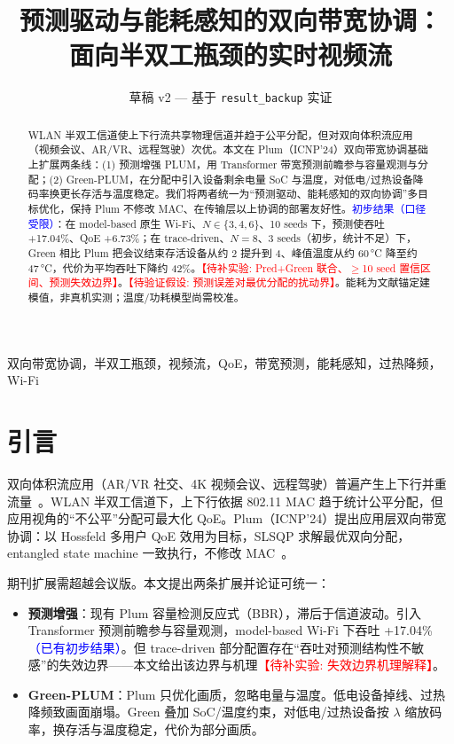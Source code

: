 \documentclass[journal,10pt]{IEEEtran}
\title{预测驱动与能耗感知的双向带宽协调：\\面向半双工瓶颈的实时视频流}
\author{草稿 v2 — 基于 \texttt{result\_backup} 实证}
\newcommand{\todoexp}[1]{\textcolor{red}{【待补实验: #1】}}
\newcommand{\todothy}[1]{\textcolor{red}{【待验证假设: #1】}}
\newcommand{\prelim}[1]{\textcolor{blue}{#1}}
\begin{document}
\maketitle

\begin{abstract}
WLAN 半双工信道使上下行流共享物理信道并趋于公平分配，但对双向体积流应用（视频会议、AR/VR、远程驾驶）次优。本文在 Plum（ICNP'24）双向带宽协调基础上扩展两条线：(1) 预测增强 PLUM，用 Transformer 带宽预测前瞻参与容量观测与分配；(2) Green-PLUM，在分配中引入设备剩余电量 SoC 与温度，对低电/过热设备降码率换更长存活与温度稳定。我们将两者统一为``预测驱动、能耗感知的双向协调''多目标优化，保持 Plum 不修改 MAC、在传输层以上协调的部署友好性。\prelim{初步结果（口径受限）}：在 model-based 原生 Wi-Fi、$N\in\{3,4,6\}$、10 seeds 下，预测使吞吐 +17.04\%、QoE +6.73\%；在 trace-driven、$N=8$、3 seeds（初步，统计不足）下，Green 相比 Plum 把会议结束存活设备从约 2 提升到 4、峰值温度从约 60\,°C 降至约 47\,°C，代价为平均吞吐下降约 42\%。\todoexp{Pred+Green 联合、$\geq$10 seed 置信区间、预测失效边界}。\todothy{预测误差对最优分配的扰动界}。能耗为文献锚定建模值，非真机实测；温度/功耗模型尚需校准。
\end{abstract}

\begin{IEEEkeywords}
双向带宽协调，半双工瓶颈，视频流，QoE，带宽预测，能耗感知，过热降频，Wi-Fi
\end{IEEEkeywords}

\section{引言}
双向体积流应用（AR/VR 社交、4K 视频会议、远程驾驶）普遍产生上下行并重流量~\cite{ton0580,ton0191,ton0289}。WLAN 半双工信道下，上下行依据 802.11 MAC 趋于统计公平分配，但应用视角的``不公平''分配可最大化 QoE。Plum（ICNP'24）提出应用层双向带宽协调：以 Hossfeld 多用户 QoE 效用为目标，SLSQP 求解最优双向分配，entangled state machine 一致执行，不修改 MAC~\cite{plum2024}。

期刊扩展需超越会议版。本文提出两条扩展并论证可统一：
\begin{itemize}
  \item \textbf{预测增强}：现有 Plum 容量检测反应式（BBR），滞后于信道波动。引入 Transformer 预测前瞻参与容量观测，model-based Wi-Fi 下吞吐 +17.04\%\prelim{（已有初步结果）}。但 trace-driven 部分配置存在``吞吐对预测结构性不敏感''的失效边界——本文给出该边界与机理\todoexp{失效边界机理解释}。
  \item \textbf{Green-PLUM}：Plum 只优化画质，忽略电量与温度。低电设备掉线、过热降频致画面崩塌。Green 叠加 SoC/温度约束，对低电/过热设备按 $\lambda$ 缩放码率，换存活与温度稳定，代价为部分画质。
\end{itemize}
\end{document}
